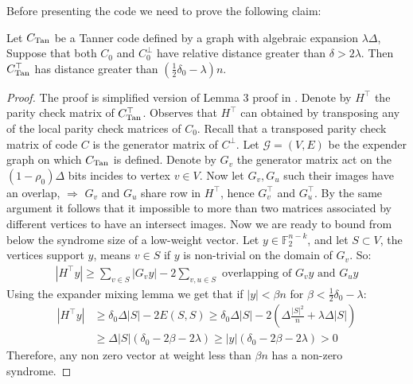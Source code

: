 Before presenting the code we need to prove the following claim:
\begin{claim}
  \label{claim:transposedtan}
  Let $C_{\text{Tan}}$ be a Tanner code defined by a graph with algebraic expansion $\lambda \Delta$, Suppose that both $C_{0}$ and $C_{0}^{\perp}$ have relative distance greater than $\delta > 2\lambda$. Then $C_{\text{Tan}}^{\top}$ has distance greater than $(\frac{1}{2}\delta_{0} - \lambda)n$.
\end{claim}
\begin{proof}
  The proof is simplified version of Lemma 3 proof in \cite{Panteleev_2022}.  Denote by $H^\top$ the parity check matrix of $C_{\text{Tan}}^\top$. Observes that $H^\top$ can obtained by transposing any of the local parity check matrices of $C_0$. Recall that a transposed parity check matrix of code $C$ is the generator matrix of $C^\perp$. Let $\mathcal{G} = (V, E)$ be the expender graph on which $C_{\text{Tan}}$ is defined. Denote by $G_{v}$ the generator matrix act on the $(1-\rho_{0})\Delta$ bits incides to vertex $v \in V$. Now let $G_{v}, G_{u}$ such their images have an overlap, $\Rightarrow$ $G_{v}$ and $G_{u}$ share row in $H^{\top}$, hence $G^{\top}_{v}$ and $G^{\top}_{u}$. By the same argument it follows that it impossible to more than two matrices associated by different vertices to have an intersect images. Now we are ready to bound from below the syndrome size of a low-weight vector. 
  Let $y \in \mathbb{F}_{2}^{n-k}$, and let $S \subset V$, the vertices support $y$, means $v \in S$ if $y$ is non-trivial on the domain of $G_{v}$. So:
  \begin{equation*}
    \begin{split}
|H^\top y| \ge \sum_{v\in S}{ |G_{v}y|  } - 2\sum_{v,u\in S}{ \text{ overlapping of } G_{v}y \text{ and } G_{u}y  }   
    \end{split}
  \end{equation*}
  Using the expander mixing lemma \cite{hoory2006expander} we get that if $|y| < \beta n$ for $\beta < \frac{1}{2}\delta_0 - \lambda$:
     \begin{equation*}
    \begin{split}
      | H^\top y | & \ge \delta_{0}\Delta|S| - 2E(S,S) \ge \delta_{0}\Delta|S| - 2\left( \Delta\frac{|S|^2}{n} + \lambda\Delta|S| \right) \\
      & \ge \Delta |S|\left( \delta_{0} - 2\beta - 2\lambda  \right) \ge |y| \left( \delta_{0} - 2\beta - 2\lambda  \right) > 0
    \end{split}
  \end{equation*}
  Therefore, any non zero vector at weight less than $\beta n$ has a non-zero syndrome.
\end{proof}

